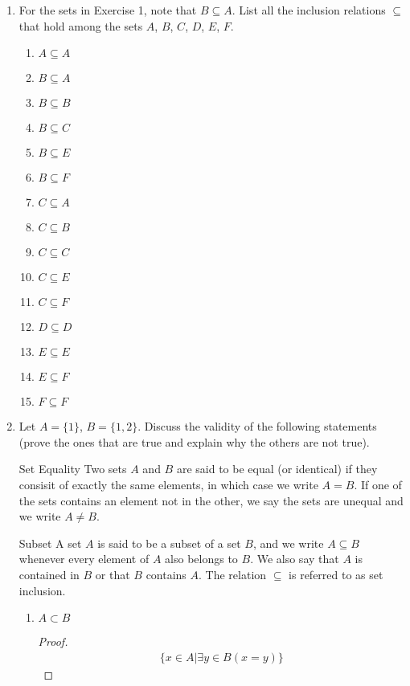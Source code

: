 \begin{enumerate}
  \item For the sets in Exercise 1, note that $B \subseteq A$. List all the inclusion relations $\subseteq$ that hold among the sets $A$, $B$, $C$, $D$, $E$, $F$.
  \begin{enumerate}
    \item $A \subseteq A$
    \item $B \subseteq A$
    \item $B \subseteq B$
    \item $B \subseteq C$
    \item $B \subseteq E$
    \item $B \subseteq F$
    \item $C \subseteq A$
    \item $C \subseteq B$
    \item $C \subseteq C$
    \item $C \subseteq E$
    \item $C \subseteq F$
    \item $D \subseteq D$
    \item $E \subseteq E$
    \item $E \subseteq F$
    \item $F \subseteq F$
  \end{enumerate}

  \item Let $A = \{1\}$, $B = \{1, 2\}$. Discuss the validity of the following statements (prove the ones that are true and explain why the others are not true).
  \begin{definition}{Set Equality}
    Two sets $A$ and $B$ are said to be equal (or identical) if they consisit of exactly the same elements, in which case we write $A = B$. If one of the sets contains an element not in the other, we say the sets are unequal and we write $A \neq B$.
  \end{definition}
  \begin{definition}{Subset}
    \label{definition:subset}
    A set $A$ is said to be a subset of a set $B$, and we write $A \subseteq B$ whenever every element of $A$ also belongs to $B$. We also say that $A$ is contained in $B$ or that $B$ contains $A$. The relation $\subseteq$ is referred to as set inclusion.
  \end{definition}
  \begin{enumerate}

    \item \begin{proposition}
      $A \subset B$
    \end{proposition}
    \begin{proof}
      \begin{equation}
        \begin{split}
          \{ x \in A | \exists y \in B (x = y)\}
        \end{split}
      \end{equation}
    \end{proof}


\end{enumerate}
\end{enumerate}
